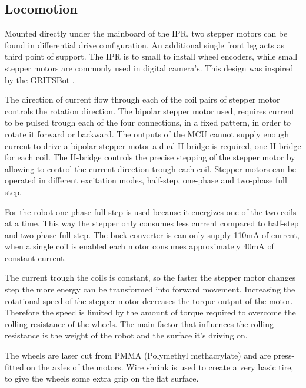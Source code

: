 \documentclass[letterpaper, 10 pt, conference]{ieeeconf}  %
\begin{document}
\subsection{Locomotion}


Mounted directly under the mainboard of the IPR, two stepper motors can be found in differential drive configuration.
An additional single front leg acts as third point of support.
The IPR is to small to install wheel encoders, while small stepper motors are commonly used in digital camera's.
This design was inspired by the GRITSBot \cite{pickem_icra_2015}.

The direction of current flow through each of the coil pairs of stepper motor controls the rotation direction.
The bipolar stepper motor used, requires current to be pulsed trough each of the four connections, in a fixed pattern, in order to rotate it forward or backward.
The outputs of the MCU cannot supply enough current to drive a bipolar stepper motor a dual H-bridge is required, one H-bridge for each coil.
The H-bridge controls the precise stepping of the stepper motor by allowing to control the current direction trough each coil.
Stepper motors can be operated in different excitation modes, half-step, one-phase and two-phase full step.

For the robot one-phase full step is used because it energizes one of the two coils at a time.
This way the stepper only consumes less current compared to half-step and two-phase full step.
The buck converter is can only supply 110mA of current, when a single coil is enabled each motor consumes approximately 40mA of constant current.

The current trough the coils is constant, so the faster the stepper motor changes step the more energy can be transformed into forward movement.
Increasing the rotational speed of the stepper motor decreases the torque output of the motor.
Therefore the speed is limited by the amount of torque required to overcome the rolling resistance of the wheels.
The main factor that influences the rolling resistance is the weight of the robot and the surface it's driving on.

The wheels are laser cut from PMMA (Polymethyl methacrylate) and are press-fitted on the axles of the motors.
Wire shrink is used to create a very basic tire, to give the wheels some extra grip on the flat surface.
\end{document}
